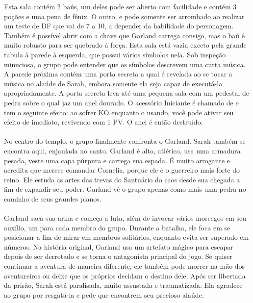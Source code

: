 %
\ofpar
%
 Esta sala contém 2 baús, um deles pode ser aberto com facilidade e contém 3 poções e uma pena de fênix. 
O outro,  e pode somente ser arrombado ao realizar um teste de DF que vai de 7 a 10, a depender da habilidade do personagem.
Também é possível abrir com a chave que Garland carrega consigo, mas o baú é muito robusto para ser quebrado à força.
%
\ofpar
%
 Esta sala está vazia exceto pela grande tabula à parede à esquerda, que possui vários símbolos nela. 
Sob inspeção minuciosa, o grupo pode entender que os símbolos descrevem uma curta música.
A parede próxima contém uma porta secreta a qual é revelada ao se tocar a música no alaúde de Sarah, embora somente ela seja capaz de executá-la apropriadamente.
A porta secreta leva até uma pequena sala com um pedestal de pedra sobre o qual jaz um anel dourado.
O acessório Iniciante é chamado de  e tem o seguinte efeito: ao sofrer KO enquanto o usando, você pode ativar seu efeito de imediato, revivendo com 1 PV. O anel é então destruído.
%
\clearpage
%
\\\\
%
 No centro do templo, o grupo finalmente confronta o Garland. 
Sarah também se encontra aqui, enjaulada no canto. Garland é alto, atlético, usa uma armadura pesada, veste uma capa púrpura e carrega sua espada.
É muito arrogante e acredita que merece comandar Cornelia, porque ele é o guerreiro mais forte do reino.
Ele estuda as artes das trevas do Santuário do caos desde sua chegada a fim de expandir seu poder.
Garland vê o grupo apenas como mais uma pedra no caminho de seus grandes planos.
%
\vfill
%
\\\\
%
Garland saca sua arma e começa a luta, além de invocar vários morcegos em seu auxílio, um para cada membro do grupo.
Durante a batalha, ele foca em se posicionar a fim de mirar em membros solitários, enquanto evita ser superado em números.
Na história original, Garland usa um artefato mágico para escapar depois de ser derrotado e se torna o antagonista principal do jogo.
Se quiser continuar a aventura de maneira diferente, ele também pode morrer na mão dos aventureiros ou deixe que os próprios decidam o destino dele.
Após ser libertada da prisão, Sarah está paralisada, muito assustada e traumatizada.
Ela agradece ao grupo por resgatá-la e pede que encontrem seu precioso alaúde. 
